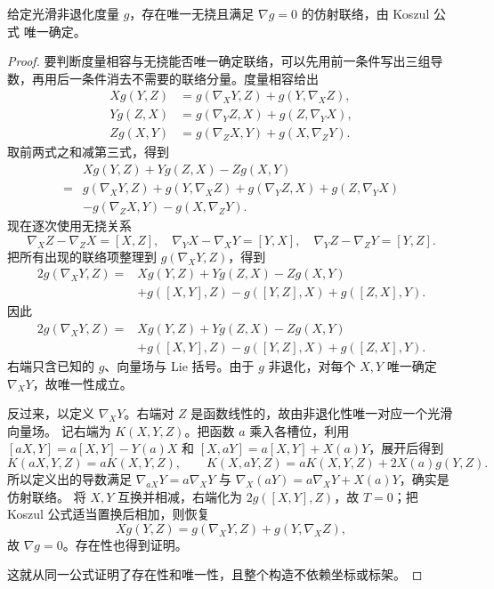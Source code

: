 \begin{theorem}
给定光滑非退化度量 $g$，存在唯一无挠且满足 $\nabla g=0$ 的仿射联络，由 Koszul 公式  唯一确定。
\end{theorem}

\begin{proof}
要判断度量相容与无挠能否唯一确定联络，可以先用前一条件写出三组导数，再用后一条件消去不需要的联络分量。度量相容给出
\begin{align*}
Xg(Y,Z)&=g(\nabla_XY,Z)+g(Y,\nabla_XZ),\\
Yg(Z,X)&=g(\nabla_YZ,X)+g(Z,\nabla_YX),\\
Zg(X,Y)&=g(\nabla_ZX,Y)+g(X,\nabla_ZY).
\end{align*}
取前两式之和减第三式，得到
\begin{align*}
&Xg(Y,Z)+Yg(Z,X)-Zg(X,Y)\\
={}&g(\nabla_XY,Z)+g(Y,\nabla_XZ)
+g(\nabla_YZ,X)+g(Z,\nabla_YX)\\
&-g(\nabla_ZX,Y)-g(X,\nabla_ZY).
\end{align*}
现在逐次使用无挠关系
\[
\nabla_XZ-\nabla_ZX=[X,Z],
\quad
\nabla_YX-\nabla_XY=[Y,X],
\quad
\nabla_YZ-\nabla_ZY=[Y,Z].
\]
把所有出现的联络项整理到 $g(\nabla_XY,Z)$，得到
\begin{align*}
2g(\nabla_XY,Z)
={}&Xg(Y,Z)+Yg(Z,X)-Zg(X,Y)\\
&+g([X,Y],Z)-g([Y,Z],X)+g([Z,X],Y).
\end{align*}
因此
\begin{equation}\label{eq:math-dg-koszul-formula}
\boxed{
\begin{aligned}
2g(\nabla_XY,Z)
={}&Xg(Y,Z)+Yg(Z,X)-Zg(X,Y)\\
&+g([X,Y],Z)-g([Y,Z],X)+g([Z,X],Y).
\end{aligned}}
\end{equation}
右端只含已知的 $g$、向量场与 Lie 括号。由于 $g$ 非退化，对每个 $X,Y$ 唯一确定 $\nabla_XY$，故唯一性成立。

反过来，以定义 $\nabla_XY$。右端对 $Z$ 是函数线性的，故由非退化性唯一对应一个光滑向量场。
记右端为 $K(X,Y,Z)$。把函数 $a$ 乘入各槽位，利用 $[aX,Y]=a[X,Y]-Y(a)X$ 和 $[X,aY]=a[X,Y]+X(a)Y$，展开后得到
\[
K(aX,Y,Z)=aK(X,Y,Z),\qquad
K(X,aY,Z)=aK(X,Y,Z)+2X(a)g(Y,Z).
\]
所以定义出的导数满足 $\nabla_{aX}Y=a\nabla_XY$ 与 $\nabla_X(aY)=a\nabla_XY+X(a)Y$，确实是仿射联络。
将 $X,Y$ 互换并相减，右端化为 $2g([X,Y],Z)$，故 $T=0$；把 Koszul 公式适当置换后相加，则恢复
\[
Xg(Y,Z)=g(\nabla_XY,Z)+g(Y,\nabla_XZ),
\]
故 $\nabla g=0$。存在性也得到证明。

这就从同一公式证明了存在性和唯一性，且整个构造不依赖坐标或标架。
\end{proof}


